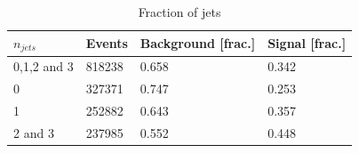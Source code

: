 \documentclass[../../main/main.tex]{subfiles}
\begin{document}
  


\begin{table}[H]
  \centering
  \begin{ruledtabular}
    \begin{tabular}{l|lll}
      \(n_{jets}\) & Events & Background [frac.] & Signal [frac.] \\
      \hline
      0,1,2 and 3 & 818238  & 0.658 & 0.342 \\
      0 &  327371 & 0.747 & 0.253 \\
      1 & 252882 & 0.643 & 0.357 \\
      2 and 3 & 237985 & 0.552 & 0.448 \\
    \end{tabular}
  \end{ruledtabular}
  \caption{Fraction of jets}
  \label{tab:events}
\end{table}
\end{document}
